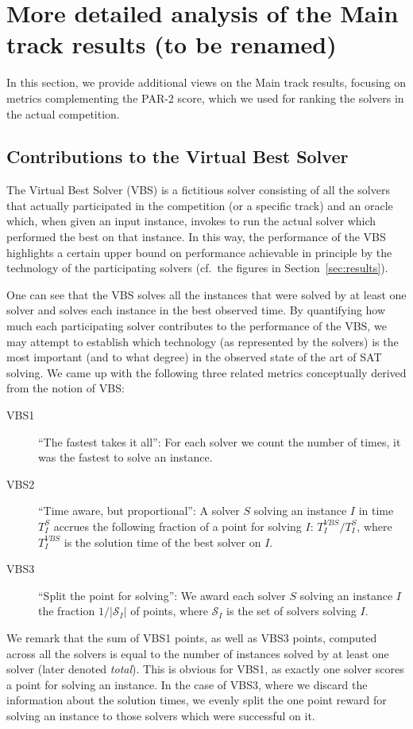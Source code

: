 \documentclass{elsarticle}
\begin{document}
\section{More detailed analysis of the Main track results (to be renamed)}

In this section, we provide additional views on the Main track results,
focusing on metrics complementing the PAR-2 score, 
which we used for ranking the solvers in the actual competition.

\subsection{Contributions to the Virtual Best Solver}

The Virtual Best Solver (VBS) is a fictitious solver consisting 
of all the solvers that actually participated in the competition (or a specific track)
and an oracle which, when given an input instance,
invokes to run the actual solver which performed the best on that instance.
In this way, the performance of the VBS highlights a certain upper bound 
on performance achievable in principle by the technology 
of the participating solvers (cf.~the figures in Section~\ref{sec:results}). 

One can see that the VBS solves all the instances that
were solved by at least one solver and solves each instance in the best observed time.
By quantifying how much each participating solver contributes
to the performance of the VBS, we may attempt to establish which
technology (as represented by the solvers) is the most important
(and to what degree) in the observed state of the art of SAT solving.
We came up with the following three related metrics conceptually derived
from the notion of VBS:
\begin{description}
\item[VBS1]
``The fastest takes it all'':
For each solver we count the number of times, it was the fastest to solve an instance.
\item[VBS2]
``Time aware, but proportional'':
A solver $S$ solving an instance $I$ in time $T^S_I$ accrues 
the following fraction of a point for solving $I$:
$T^\mathit{VBS}_I/T^S_I$, where $T^\mathit{VBS}_I$ is the solution time of the best solver on $I$.
\item[VBS3]
``Split the point for solving'':
We award each solver $S$ solving an instance $I$ the fraction $1/|\mathcal{S}_I|$ of points, where
$\mathcal{S}_I$ is the set of solvers solving $I$.
\end{description}
We remark that the sum of VBS1 points, as well as VBS3 points, computed across all the solvers
is equal to the number of instances solved by at least one solver (later denoted \emph{total}).
This is obvious for VBS1, as exactly one solver scores a point for solving an instance.
In the case of VBS3, where we discard the information about the solution times, 
we evenly split the one point reward for solving an instance to those solvers which were successful on it.
\end{document}
